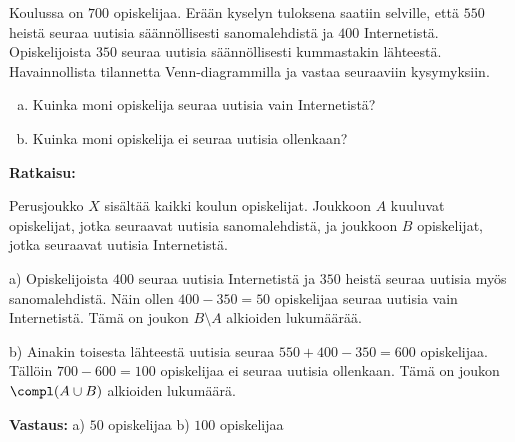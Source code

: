\begin{esimerkki}
Koulussa on $700$ opiskelijaa. Erään kyselyn tuloksena saatiin selville, että $550$ heistä 
seuraa uutisia säännöllisesti sanomalehdistä ja $400$ Internetistä. Opiskelijoista $350$  
seuraa uutisia säännöllisesti kummastakin lähteestä. Havainnollista tilannetta Venn-diagrammilla ja vastaa seuraaviin kysymyksiin.
\begin{enumerate}[a)]
\item Kuinka moni opiskelija seuraa uutisia vain Internetistä?
\item Kuinka moni opiskelija ei seuraa uutisia ollenkaan?
\end{enumerate}

{\bf Ratkaisu:}

\begin{center}




\end{center}

Perusjoukko $X$ sisältää kaikki koulun opiskelijat. Joukkoon $A$ kuuluvat opiskelijat, jotka seuraavat uutisia sanomalehdistä, ja joukkoon $B$ opiskelijat, jotka seuraavat uutisia Internetistä.

a) Opiskelijoista $400$ seuraa uutisia Internetistä ja $350$ heistä seuraa uutisia myös sanomalehdistä. Näin ollen $400 - 350 = 50$ opiskelijaa seuraa uutisia vain Internetistä. Tämä on joukon $B \setminus A$ alkioiden lukumäärää. 

b) Ainakin toisesta lähteestä uutisia seuraa $550 + 400 - 350 = 600$ opiskelijaa. Tällöin $700 - 600 = 100$ opiskelijaa ei seuraa uutisia ollenkaan. Tämä on joukon $\compl(A\cup B)$ alkioiden lukumäärä.

{\bf Vastaus:} a) $50$ opiskelijaa b) $100$ opiskelijaa
\end{esimerkki}


